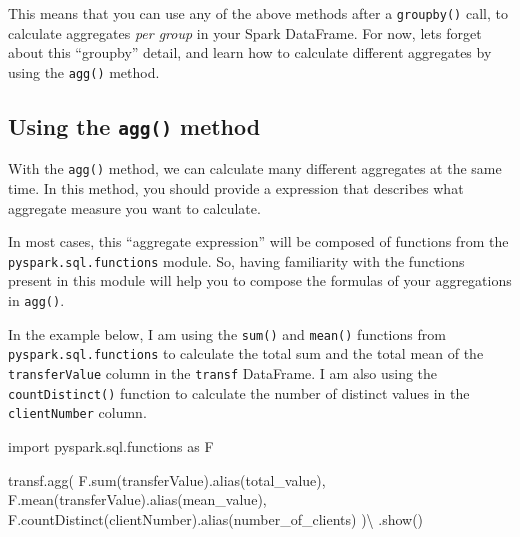 \documentclass[
  11pt,
  letterpaper,
  DIV=11,
  numbers=noendperiod]{scrreprt}
\newenvironment{Shaded}{\begin{snugshade}}{\end{snugshade}}
\newcommand{\BuiltInTok}[1]{\textcolor[rgb]{0.00,0.23,0.31}{#1}}
\newcommand{\ImportTok}[1]{\textcolor[rgb]{0.00,0.46,0.62}{#1}}
\newcommand{\NormalTok}[1]{\textcolor[rgb]{0.00,0.23,0.31}{#1}}
\newcommand{\OperatorTok}[1]{\textcolor[rgb]{0.37,0.37,0.37}{#1}}
\newcommand{\StringTok}[1]{\textcolor[rgb]{0.13,0.47,0.30}{#1}}
\begin{document}
This means that you can use any of the above methods after a
\texttt{groupby()} call, to calculate aggregates \emph{per group} in
your Spark DataFrame. For now, lets forget about this ``groupby''
detail, and learn how to calculate different aggregates by using the
\texttt{agg()} method.

\hypertarget{sec-agg-method}{%
\subsection{\texorpdfstring{Using the \texttt{agg()}
method}{Using the agg() method}}\label{sec-agg-method}}

With the \texttt{agg()} method, we can calculate many different
aggregates at the same time. In this method, you should provide a
expression that describes what aggregate measure you want to calculate.

In most cases, this ``aggregate expression'' will be composed of
functions from the \texttt{pyspark.sql.functions} module. So, having
familiarity with the functions present in this module will help you to
compose the formulas of your aggregations in \texttt{agg()}.

In the example below, I am using the \texttt{sum()} and \texttt{mean()}
functions from \texttt{pyspark.sql.functions} to calculate the total sum
and the total mean of the \texttt{transferValue} column in the
\texttt{transf} DataFrame. I am also using the \texttt{countDistinct()}
function to calculate the number of distinct values in the
\texttt{clientNumber} column.

\begin{Shaded}
\begin{Highlighting}[]
\ImportTok{import}\NormalTok{ pyspark.sql.functions }\ImportTok{as}\NormalTok{ F}

\NormalTok{transf.agg(}
\NormalTok{    F.}\BuiltInTok{sum}\NormalTok{(}\StringTok{\textquotesingle{}transferValue\textquotesingle{}}\NormalTok{).alias(}\StringTok{\textquotesingle{}total\_value\textquotesingle{}}\NormalTok{),}
\NormalTok{    F.mean(}\StringTok{\textquotesingle{}transferValue\textquotesingle{}}\NormalTok{).alias(}\StringTok{\textquotesingle{}mean\_value\textquotesingle{}}\NormalTok{),}
\NormalTok{    F.countDistinct(}\StringTok{\textquotesingle{}clientNumber\textquotesingle{}}\NormalTok{).alias(}\StringTok{\textquotesingle{}number\_of\_clients\textquotesingle{}}\NormalTok{)}
\NormalTok{  )}\OperatorTok{\textbackslash{}}
\NormalTok{  .show()}
\end{Highlighting}
\end{Shaded}
\end{document}
